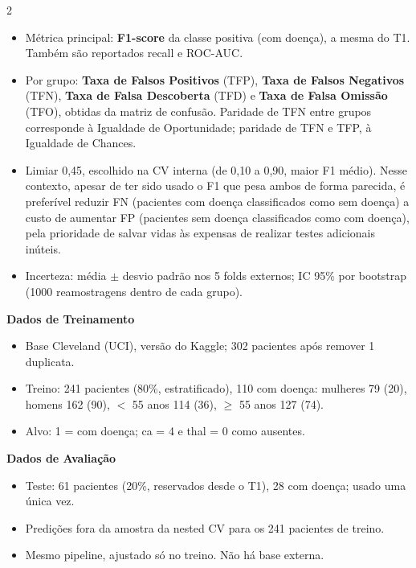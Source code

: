 \documentclass[10pt,a4paper]{article}
\newcommand{\secao}[1]{\par\vspace{5pt}{\normalsize\bfseries #1}\par\vspace{1pt}}
\begin{document}
\begin{paracol}{2}
\secao{Métricas}
\begin{itemize}
\item Métrica principal: \textbf{F1-score} da classe positiva (com doença), a mesma do T1. Também são reportados recall e ROC-AUC.
\item Por grupo: \textbf{Taxa de Falsos Positivos} (TFP), \textbf{Taxa de Falsos Negativos} (TFN), \textbf{Taxa de Falsa Descoberta} (TFD) e \textbf{Taxa de Falsa Omissão} (TFO), obtidas da matriz de confusão. Paridade de TFN entre grupos corresponde à Igualdade de Oportunidade; paridade de TFN e TFP, à Igualdade de Chances.
\item Limiar 0,45, escolhido na CV interna (de 0,10 a 0,90, maior F1 médio). Nesse contexto, apesar de ter sido usado o F1 que pesa ambos de forma parecida, é preferível reduzir FN (pacientes com doença classificados como sem doença) a custo de aumentar FP (pacientes sem doença classificados como com doença), pela prioridade de salvar vidas às expensas de realizar testes adicionais inúteis.
\item Incerteza: média $\pm$ desvio padrão nos 5 folds externos; IC 95\% por bootstrap (1000 reamostragens dentro de cada grupo).
\end{itemize}

\vspace{4pt}
\begin{minipage}[t]{0.485\linewidth}
{\normalsize\bfseries Dados de Treinamento}\par\vspace{1pt}
\begin{itemize}
\item Base Cleveland (UCI), versão do Kaggle; 302 pacientes após remover 1 duplicata.
\item Treino: 241 pacientes (80\%, estratificado), 110 com doença: mulheres 79 (20), homens 162 (90), $<$ 55 anos 114 (36), $\geq$ 55 anos 127 (74).
\item Alvo: 1 = com doença; ca = 4 e thal = 0 como ausentes.
\end{itemize}
\end{minipage}\hfill
\begin{minipage}[t]{0.485\linewidth}
{\normalsize\bfseries Dados de Avaliação}\par\vspace{1pt}
\begin{itemize}
\item Teste: 61 pacientes (20\%, reservados desde o T1), 28 com doença; usado uma única vez.
\item Predições fora da amostra da nested CV para os 241 pacientes de treino.
\item Mesmo pipeline, ajustado só no treino. Não há base externa.
\end{itemize}
\end{minipage}


\end{paracol}
\end{document}
